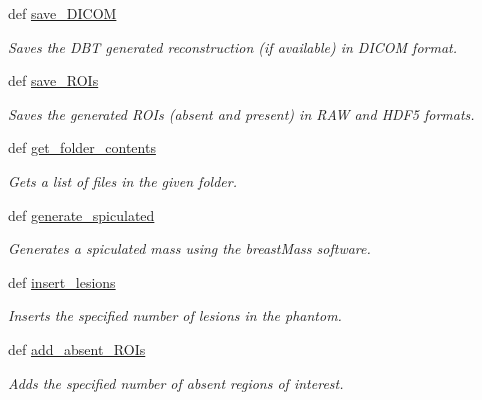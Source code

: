 \begin{DoxyCompactItemize}
def \hyperlink{classVictre_1_1Pipeline_1_1Pipeline_a38cf3bb515b5c52d4010867bc3dfc1d0}{save\-\_\-\-D\-I\-C\-O\-M}
\begin{DoxyCompactList}\small\item\em Saves the D\-B\-T generated reconstruction (if available) in D\-I\-C\-O\-M format. \end{DoxyCompactList}\item 
def \hyperlink{classVictre_1_1Pipeline_1_1Pipeline_ab41af48a6a0860907671a80d4d1fffd6}{save\-\_\-\-R\-O\-Is}
\begin{DoxyCompactList}\small\item\em Saves the generated R\-O\-Is (absent and present) in R\-A\-W and H\-D\-F5 formats. \end{DoxyCompactList}\item 
def \hyperlink{classVictre_1_1Pipeline_1_1Pipeline_ae6bc9a133eb885f8aa605ff80fc7f784}{get\-\_\-folder\-\_\-contents}
\begin{DoxyCompactList}\small\item\em Gets a list of files in the given folder. \end{DoxyCompactList}\item 
def \hyperlink{classVictre_1_1Pipeline_1_1Pipeline_aa63a440812d2bbeec712e6c4f9054f1d}{generate\-\_\-spiculated}
\begin{DoxyCompactList}\small\item\em Generates a spiculated mass using the breast\-Mass software. \end{DoxyCompactList}\item 
def \hyperlink{classVictre_1_1Pipeline_1_1Pipeline_aab8f3f01f7247868aecd5bac81323263}{insert\-\_\-lesions}
\begin{DoxyCompactList}\small\item\em Inserts the specified number of lesions in the phantom. \end{DoxyCompactList}\item 
def \hyperlink{classVictre_1_1Pipeline_1_1Pipeline_a6ed9f1e6df840d9a5753860de0312272}{add\-\_\-absent\-\_\-\-R\-O\-Is}
\begin{DoxyCompactList}\small\item\em Adds the specified number of absent regions of interest. \end{DoxyCompactList}\end{DoxyCompactItemize}

